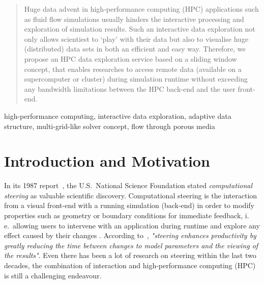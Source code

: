 \documentclass[10pt, conference]{IEEEtran}
\begin{document}
\begin{abstract}

Huge data advent in high-performance computing (HPC) applications such as fluid flow simulations usually hinders the interactive processing and exploration of simulation results. Such an
interactive data exploration not only allows scientiest to `play' with their data but also to visualise huge (distributed) data sets in both an efficient and easy way. Therefore, we propose an HPC
data exploration service based on a sliding window concept, that enables researches to access remote data (available on a supercomputer or cluster) during simulation runtime without
exceeding any bandwidth limitations between the HPC back-end and the user front-end.

\end{abstract}

\begin{IEEEkeywords}
high-performance computing, interactive data exploration, adaptive data structure, multi-grid-like solver concept, flow through porous media
\end{IEEEkeywords}

\pagestyle{empty}
\thispagestyle{fancy}
\lhead{}
\chead{}
\rhead{}
\cfoot{}
\rfoot{}

\flushbottom


%

\section{Introduction and Motivation}

In its 1987 report~\cite{McCormick1987}, the U.S.\ National Science Foundation stated \emph{computational steering} as valuable scientific discovery. Computational steering is the interaction
from a visual front-end with a running simulation (back-end) in order to modify properties such as geometry or boundary conditions for immediate feedback, i.\,e.\ allowing users to intervene with
an application during runtime and explore any effect caused by their changes \cite{Mulder1999}. According to~\cite{Marshall1990}, \emph{"steering enhances productivity by greatly reducing the
time between changes to model parameters and the viewing of the results"}. Even there has been a lot of research on steering within the last two decades, the combination of interaction and
high-performance computing (HPC) is still a challenging endeavour.
\end{document}
